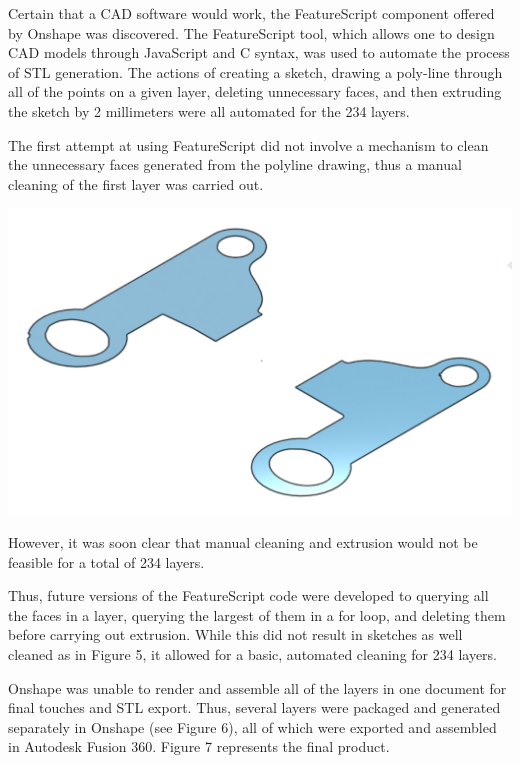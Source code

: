 \documentclass[11pt, A4paper]{article}
\begin{document}
\begin{multicols}{2}
Certain that a CAD software would work, the FeatureScript component offered by Onshape was discovered. The FeatureScript tool, which allows one to design CAD models through JavaScript and C syntax, was used to automate the process of STL generation. The actions of creating a sketch, drawing a poly-line through all of the points on a given layer, deleting unnecessary faces, and then extruding the sketch by 2 millimeters were all automated for the 234 layers. 

The first attempt at using FeatureScript did not involve a mechanism to clean the unnecessary faces generated from the polyline drawing, thus a manual cleaning of the first layer was carried out.

\begingroup
    \bigskip
    \centering
    \includegraphics[width=\columnwidth]{onshape_one}
    \small{}
    \label{fig:onshape_one}
        \bigskip
\endgroup

However, it was soon clear that manual cleaning and extrusion would not be feasible for a total of 234 layers. 

Thus, future versions of the FeatureScript code were developed to querying all the faces in a layer, querying the largest of them in a for loop, and deleting them before carrying out extrusion. While this did not result in sketches as well cleaned as in Figure 5, it allowed for a basic, automated cleaning for 234 layers. 

Onshape was unable to render and assemble all of the layers in one document for final touches and STL export. Thus, several layers were packaged and generated separately in Onshape (see Figure 6), all of which were exported and assembled in Autodesk Fusion 360. Figure 7 represents the final product. 


\end{multicols}
\end{document}
